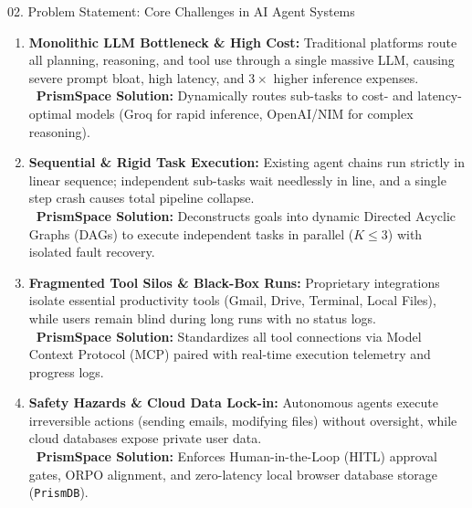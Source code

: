 \documentclass[aspectratio=169,10pt]{beamer}
\begin{document}
\begin{frame}[t]{02. Problem Statement: Core Challenges in AI Agent Systems}
\vspace{0.25em}

\centering
\begin{minipage}{0.95\linewidth}
\fontsize{7.8}{10.0}\selectfont

\begin{enumerate}\setlength{\itemsep}{7.5pt}\setlength{\leftmargin}{0.28in}
  \item \textbf{Monolithic LLM Bottleneck \& High Cost:} Traditional platforms route all planning, reasoning, and tool use through a single massive LLM, causing severe prompt bloat, high latency, and $3\times$ higher inference expenses.\\
  \textcolor{prismTeal!90!black}{\textbf{\faArrowCircleRight\ PrismSpace Solution:}} Dynamically routes sub-tasks to cost- and latency-optimal models (Groq for rapid inference, OpenAI/NIM for complex reasoning).

  \item \textbf{Sequential \& Rigid Task Execution:} Existing agent chains run strictly in linear sequence; independent sub-tasks wait needlessly in line, and a single step crash causes total pipeline collapse.\\
  \textcolor{prismTeal!90!black}{\textbf{\faArrowCircleRight\ PrismSpace Solution:}} Deconstructs goals into dynamic Directed Acyclic Graphs (DAGs) to execute independent tasks in parallel ($K \le 3$) with isolated fault recovery.

  \item \textbf{Fragmented Tool Silos \& Black-Box Runs:} Proprietary integrations isolate essential productivity tools (Gmail, Drive, Terminal, Local Files), while users remain blind during long runs with no status logs.\\
  \textcolor{prismTeal!90!black}{\textbf{\faArrowCircleRight\ PrismSpace Solution:}} Standardizes all tool connections via Model Context Protocol (MCP) paired with real-time execution telemetry and progress logs.

  \item \textbf{Safety Hazards \& Cloud Data Lock-in:} Autonomous agents execute irreversible actions (sending emails, modifying files) without oversight, while cloud databases expose private user data.\\
  \textcolor{prismTeal!90!black}{\textbf{\faArrowCircleRight\ PrismSpace Solution:}} Enforces Human-in-the-Loop (HITL) approval gates, ORPO alignment, and zero-latency local browser database storage (\texttt{PrismDB}).
\end{enumerate}

\end{minipage}
\end{frame}
\end{document}

